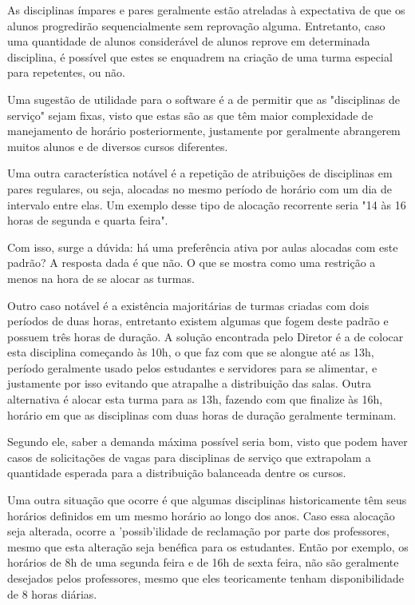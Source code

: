        As disciplinas ímpares e pares geralmente estão atreladas à expectativa de que os alunos progredirão sequencialmente sem reprovação alguma. Entretanto, caso uma quantidade de alunos considerável de alunos reprove em determinada disciplina, é possível que estes se enquadrem na criação de uma turma especial para repetentes, ou não.

        Uma sugestão de utilidade para o software é a de permitir que as "disciplinas de serviço" sejam fixas, visto que estas são as que têm maior complexidade de manejamento de horário posteriormente, justamente por geralmente abrangerem muitos alunos e de diversos cursos diferentes.

        Uma outra característica notável é a repetição de atribuições de disciplinas em pares regulares, ou seja, alocadas no mesmo período de horário com um dia de intervalo entre elas. Um exemplo desse tipo de alocação recorrente seria "14 às 16 horas de segunda e quarta feira".

        Com isso, surge a dúvida: há uma preferência ativa por aulas alocadas com este padrão? A resposta dada é que não. O que se mostra como uma restrição a menos na hora de se alocar as turmas.

        Outro caso notável é a existência majoritárias de turmas criadas com dois períodos de duas horas, entretanto existem algumas que fogem deste padrão e possuem três horas de duração. A solução encontrada pelo Diretor é a de colocar esta disciplina começando às 10h, o que faz com que se alongue até as 13h, período geralmente usado pelos estudantes e servidores para se alimentar, e justamente por isso evitando que atrapalhe a distribuição das salas. Outra alternativa é alocar esta turma para as 13h, fazendo com que finalize às 16h, horário em que as disciplinas com duas horas de duração geralmente terminam.

        Segundo ele, saber a demanda máxima possível seria bom, visto que podem haver casos de solicitações de vagas para disciplinas de serviço que extrapolam a quantidade esperada para a distribuição balanceada dentre os cursos.

        Uma outra situação que ocorre é que algumas disciplinas historicamente têm seus horários definidos em um mesmo horário ao longo dos anos. Caso essa alocação seja alterada, ocorre a 'possib'ilidade de reclamação por parte dos professores, mesmo que esta alteração seja benéfica para os estudantes. Então por exemplo, os horários de 8h de uma segunda feira e de 16h de sexta feira, não são geralmente desejados pelos professores, mesmo que eles teoricamente tenham disponibilidade de 8 horas diárias.

